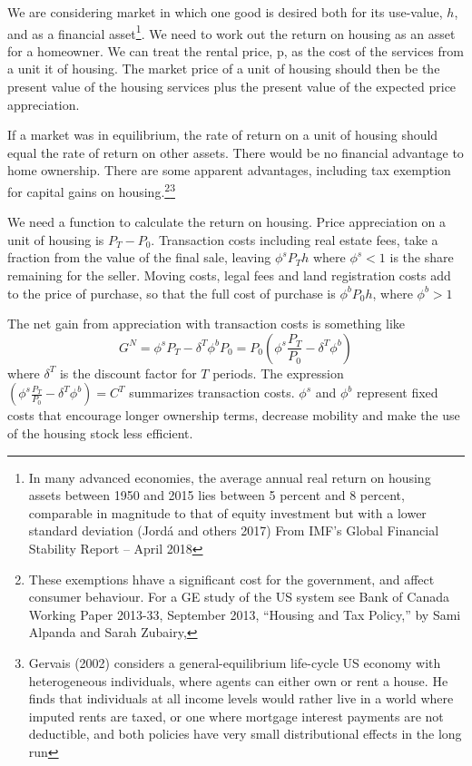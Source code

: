 \documentclass[11pt]{amsart}
\begin{document}
We are considering market in which one good is desired  both for its use-value, $h$, and as a financial asset\footnote{ In many advanced economies, the average annual real return on housing assets between 1950 and 2015 lies between 5 percent and 8 percent, comparable in magnitude to that of equity investment but with a lower standard deviation (Jord\'a and others 2017) From IMF’s Global Financial Stability Report – April 2018}.   We need to work out the return on housing as an asset for a homeowner. We can treat the rental price, p, as the cost of the services from a unit it of housing. The market price of a unit of housing  should then be the present value of the housing services plus the present value of the expected price appreciation. 

If a market was in equilibrium, the rate of return on a unit of housing should equal the rate of return on other assets. There would be no financial advantage to home ownership. There are some apparent advantages, including  tax exemption for capital gains on housing.\footnote{These exemptions hhave a significant cost for the government, and affect consumer behaviour. For a GE study of  the US system see Bank of Canada Working Paper 2013-33, September 2013, ``Housing and Tax Policy,'' by Sami Alpanda and Sarah Zubairy,}\footnote{Gervais (2002) considers a general-equilibrium life-cycle US economy with heterogeneous individuals, where agents can either own or rent a house. He finds that individuals at all income levels would rather live in a world where imputed rents are taxed, or one where mortgage interest payments are not deductible, and both policies have very small distributional effects in the long run}


We need a function to calculate the return on housing.  Price appreciation on a unit of housing is $P_T-P_0$. Transaction costs including real estate fees, take a fraction from the value of the final sale, leaving $\phi^sP_Th$ where $\phi^s<1$ is the share remaining for the seller. Moving costs, legal fees and land registration costs add to the price of purchase, so that the full cost of purchase is $\phi^bP_0h$, where $\phi^b>1$

The net gain from appreciation with transaction costs is something like \[G^N=\phi^s P_T-\delta^T\phi^b P_0=P_0(\phi^s \frac{P_T}{P_0}-\delta^T\phi^b)\]%
where $\delta^T$ is the discount factor for $T$ periods. The expression $(\phi^s \frac{P_T}{P_0}-\delta^T\phi^b)=C^T$ summarizes transaction costs. $\phi^s$ and $\phi^b$ represent  fixed costs that  encourage longer ownership terms, decrease mobility and make the use of the housing stock less efficient. 
\end{document}
